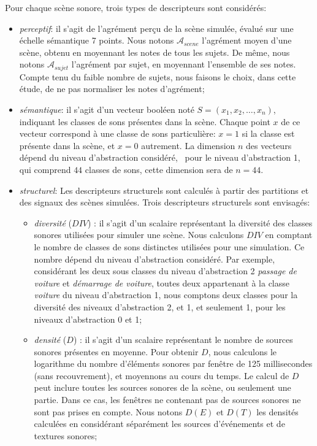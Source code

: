Pour chaque scène sonore, trois types de descripteurs sont considérés:

\begin{itemize}
\item \emph{perceptif}: il s'agit de l'agrément perçu de la scène simulée, évalué sur une échelle sémantique 7 points. Nous notons $\mathcal{A}_{scene}$ l'agrément moyen d'une scène, obtenu en moyennant les notes de tous les sujets. De même, nous notons  $\mathcal{A}_{sujet}$ l'agrément par sujet, en moyennant l'ensemble de ses notes. Compte tenu du faible nombre de sujets, nous faisons le choix, dans cette étude, de ne pas normaliser les notes d'agrément;
\item \emph{sémantique}: il s'agit d'un vecteur booléen noté $S=(x_1,x_2,\ldots,x_n)$, indiquant les classes de sons présentes dans la scène. Chaque point $x$ de ce vecteur correspond à une classe de sons particulière: $x=1$ si la classe est présente dans la scène, et $x=0$ autrement. La dimension $n$ des vecteurs dépend du niveau d'abstraction considéré, \eg~pour le niveau d'abstraction 1, qui comprend $44$ classes de sons, cette dimension sera de $n=44$.
\item \emph{structurel}: Les descripteurs structurels sont calculés à partir des partitions et des signaux des scènes simulées. Trois descripteurs structurels sont envisagés:
\begin{itemize}
\item \emph{diversité} ($DIV$) : il s'agit d'un scalaire représentant la diversité des classes sonores utilisées pour simuler une scène. Nous calculons $DIV$ en comptant le nombre de classes de sons distinctes utilisées pour une simulation. Ce nombre dépend du niveau d'abstraction considéré. Par exemple, considérant les deux sous classes du niveau d'abstraction 2 \emph{passage de voiture} et \emph{démarrage de voiture}, toutes deux appartenant à la classe \emph{voiture} du niveau d'abstraction 1, nous comptons deux classes pour la diversité des niveaux d'abstraction 2, et 1, et seulement 1, pour les niveaux d'abstraction 0 et 1;
\item \emph{densité} ($D$) : il s'agit d'un scalaire représentant le nombre de sources sonores présentes en moyenne. Pour obtenir $D$, nous calculons le logarithme du nombre d'éléments sonores par fenêtre de 125 millisecondes (sans recouvrement), et moyennons au cours du temps. Le calcul de $D$ peut inclure toutes les sources sonores de la scène, ou seulement une partie. Dans ce cas, les fenêtres ne contenant pas de sources sonores ne sont pas prises en compte. Nous notons $D(E)$ et $D(T)$ les densités calculées en considérant séparément les sources d'événements et de textures sonores;

\end{itemize}
\end{itemize}
